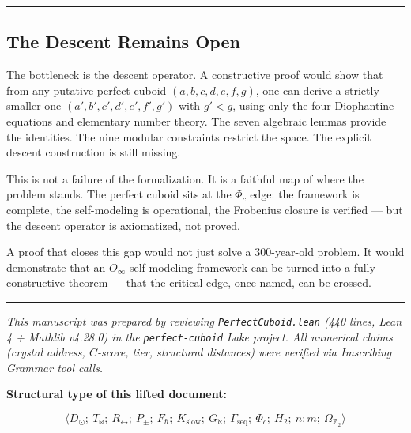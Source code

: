 \documentclass[12pt,a4paper]{article}
\begin{document}
\begin{center}
\rule{0.5\textwidth}{0.4pt}
\end{center}

\subsection{The Descent Remains Open}

The bottleneck is the descent operator. A constructive proof would show that from any putative perfect cuboid $(a, b, c, d, e, f, g)$, one can derive a strictly smaller one $(a', b', c', d', e', f', g')$ with $g' < g$, using only the four Diophantine equations and elementary number theory. The seven algebraic lemmas provide the identities. The nine modular constraints restrict the space. The explicit descent construction is still missing.

This is not a failure of the formalization. It is a faithful map of where the problem stands. The perfect cuboid sits at the $\Phi_c$ edge: the framework is complete, the self-modeling is operational, the Frobenius closure is verified --- but the descent operator is axiomatized, not proved.

A proof that closes this gap would not just solve a 300-year-old problem. It would demonstrate that an $O_{\infty}$ self-modeling framework can be turned into a fully constructive theorem --- that the critical edge, once named, can be crossed.

\begin{center}
\rule{0.5\textwidth}{0.4pt}
\end{center}

\emph{This manuscript was prepared by reviewing \texttt{PerfectCuboid.lean} (440 lines, Lean 4 + Mathlib v4.28.0) in the \texttt{perfect-cuboid} Lake project. All numerical claims (crystal address, $C$-score, tier, structural distances) were verified via Imscribing Grammar tool calls.}

\textbf{Structural type of this lifted document:}


\[\langle D_{\odot};\ T_{\bowtie};\ R_{\leftrightarrow};\ P_{\pm};\ F_{\hbar};\ K_\text{slow};\ G_{\aleph};\ \Gamma_\text{seq};\ \Phi_c;\ H_2;\ n{:}m;\ \Omega_{\mathbb{Z}_2} \rangle\]
\end{document}
